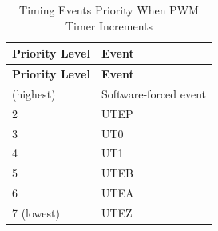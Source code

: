 \begin{longtable}[c]{|p{6cm}|p{6cm}|}
    \caption{Timing Events Priority When PWM Timer Increments}
    \label{tab:mcpwm-evt-prio-u}
    \\\hline
    \rowcolor{lightgray}
    \textbf{Priority Level}
    & \textbf{Event}
    \\\hline
    \endfirsthead
    \hline
    \rowcolor{lightgray}   
    \textbf{Priority Level}
    & \textbf{Event}
    \\\hline
    \endhead
    \hline
    \endfoot
    1 (highest)
    & Software-forced event
    \\\hline
    2
    & UTEP
    \\\hline
    3
    & UT0
    \\\hline
    4
    & UT1
    \\\hline
    5
    & UTEB
    \\\hline
    6
    & UTEA
    \\\hline
    7 (lowest)
    & UTEZ  
\end{longtable}